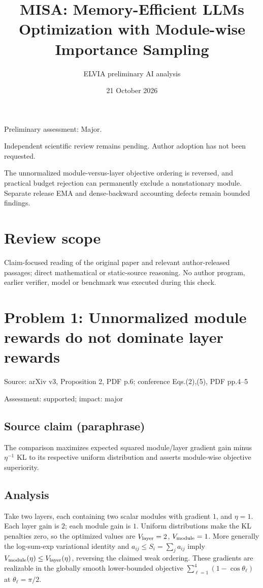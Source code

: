 \documentclass[11pt]{article}
\begin{document}
\title{MISA: Memory-Efficient LLMs Optimization with Module-wise Importance Sampling}

\author{ELVIA preliminary AI analysis}\date{21 October 2026}\maketitle

Preliminary assessment: Major.\par

Independent scientific review remains pending. Author adoption has not been requested.

The unnormalized module-versus-layer objective ordering is reversed, and practical budget rejection can permanently exclude a nonstationary module. Separate release EMA and dense-backward accounting defects remain bounded findings.

\section*{Review scope}

Claim-focused reading of the original paper and relevant author-released passages; direct mathematical or static-source reasoning. No author program, earlier verifier, model or benchmark was executed during this check.

\section*{Problem 1: Unnormalized module rewards do not dominate layer rewards}

Source: arXiv v3, Proposition 2, PDF p.6; conference Eqs.(2),(5), PDF pp.4–5

Assessment: supported; impact: major

\subsection*{Source claim (paraphrase)}

The comparison maximizes expected squared module/layer gradient gain minus \(\eta^{-1}\) KL to its respective uniform distribution and asserts module-wise objective superiority.

\subsection*{Analysis}

Take two layers, each containing two scalar modules with gradient \(1\), and \(\eta=1\). Each layer gain is \(2\); each module gain is \(1\). Uniform distributions make the KL penalties zero, so the optimized values are \(V_{\rm layer}=2\), \(V_{\rm module}=1\). More generally the log-sum-exp variational identity and \(a_{ij}\le S_i=\sum_j a_{ij}\) imply \(V_{\rm module}(\eta)\le V_{\rm layer}(\eta)\), reversing the claimed weak ordering. These gradients are realizable in the globally smooth lower-bounded objective \(\sum_{\ell=1}^4(1-\cos\theta_\ell)\) at \(\theta_\ell=\pi/2\).
\end{document}
